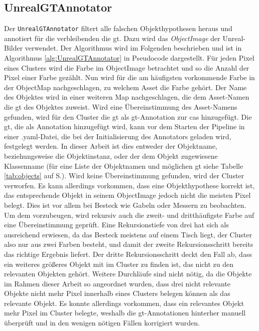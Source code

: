 \subsection{UnrealGTAnnotator}
Der \texttt{UnrealGTAnnotator} filtert alle falschen Objekthypothesen heraus und annotiert für die verbleibenden die \gls{gt}. Dazu wird das \textit{ObjectImage} der Unreal-Bilder verwendet. Der Algorithmus wird im Folgenden beschrieben und ist in Algorithmus \ref{alg:UnrealGTAnnotator} in Pseudocode dargestellt.\newline
Für jeden Pixel eines Clusters wird die Farbe im ObjectImage betrachtet und so die Anzahl der Pixel einer Farbe gezählt. Nun wird für die am häufigsten vorkommende Farbe in der ObjectMap nachgeschlagen, zu welchem Asset die Farbe gehört. Der Name des Objektes wird in einer weiteren Map nachgeschlagen, die dem Asset-Namen die \gls{gt} des Objektes zuweist. Wird eine Übereinstimmung des Asset-Namens gefunden, wird für den Cluster die \gls{gt} als \gls{gt}-Annotation zur \gls{cas} hinzugefügt. Die \gls{gt}, die als Annotation hinzugefügt wird, kann vor dem Starten der Pipeline in einer .yaml-Datei, die bei der Initialisierung des Annotators geladen wird, festgelegt werden. In dieser Arbeit ist dies entweder der Objektname, beziehungsweise die Objektinstanz, oder der dem Objekt zugewiesene Klassenname (für eine Liste der Objektnamen und möglichen \gls{gt} siehe Tabelle \ref{tab:objects} auf S.\pageref{tab:objects}). Wird keine Übereinstimmung gefunden, wird der Cluster verworfen. Es kann allerdings vorkommen, dass eine Objekthypothese korrekt ist, das entsprechende Objekt in seinem ObjectImage jedoch nicht die meisten Pixel belegt. Dies ist vor allem bei Besteck wie Gabeln oder Messern zu beobachten. Um dem vorzubeugen, wird rekursiv auch die zweit- und dritthäufigste Farbe auf eine Übereinstimmung geprüft. Eine Rekursionstiefe von drei hat sich als ausreichend erwiesen, da das Besteck meistens auf einem Tisch liegt, der Cluster also nur aus zwei Farben besteht, und damit der zweite Rekursionsschritt bereits das richtige Ergebnis liefert. Der dritte Rekursionsschritt deckt den Fall ab, dass ein weiteres größeres Objekt mit im Cluster zu finden ist, das nicht zu den relevanten Objekten gehört. Weitere Durchläufe sind nicht nötig, da die Objekte im Rahmen dieser Arbeit so angeordnet wurden, dass drei nicht relevante Objekte nicht mehr Pixel innerhalb eines Clusters belegen können als das relevante Objekt. Es konnte allerdings vorkommen, dass ein relevantes Objekt mehr Pixel im Cluster belegte, weshalb die \gls{gt}-Annotationen hinterher manuell überprüft und in den wenigen nötigen Fällen korrigiert wurden.

